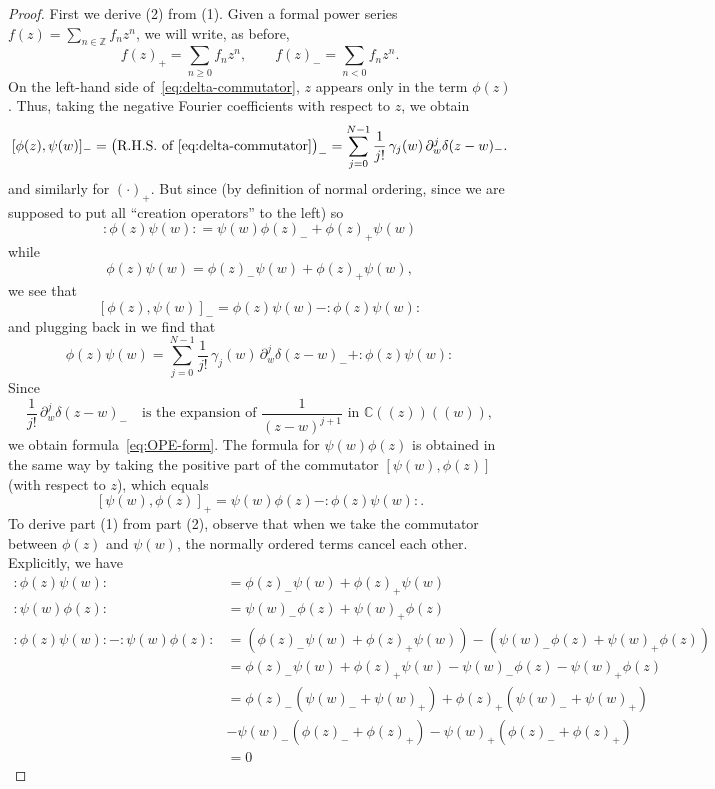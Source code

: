 \documentclass[12pt]{article}
\begin{document}
\begin{proof}
    First we derive (2) from (1).
    Given a formal power series $f(z)=\sum_{n\in\mathbb{Z}} f_n z^n$,
    we will write, as before,
    \[
        f(z)_+ = \sum_{n\ge 0} f_n z^n,
        \qquad
        f(z)_- = \sum_{n<0} f_n z^n.
    \]
    On the left-hand side of~\eqref{eq:delta-commutator},
    $z$ appears only in the term $\phi(z)$.
    Thus, taking the negative Fourier coefficients with respect to $z$, we obtain
    \[
        [\phi(z),\psi(w)]_- =
        \big(\text{R.H.S. of~\eqref{eq:delta-commutator}}\big)_- = \sum_{j=0}^{N-1} \frac{1}{j!}\,\gamma_j(w)\,
        \partial_w^j \delta(z-w)_-.
    \]
    and similarly for $(\cdot)_+$.
    But since (by definition of normal ordering, since we are supposed to put all “creation operators” to the left) so
    \[
        :\phi(z)\psi(w):
        = \psi(w)\phi(z)_- + \phi(z)_+\psi(w)
    \]
    while
    \[
        \phi(z)\psi(w) = \phi(z)_-\psi(w) + \phi(z)_+\psi(w),
    \]
    we see that
    \[
        [\phi(z),\psi(w)]_{-} =
        \phi(z)\psi(w) - :\phi(z)\psi(w):
    \]
    and plugging back in we find that
    \[
        \phi(z)\psi(w) = \sum_{j=0}^{N-1} \frac{1}{j!}\,\gamma_j(w)\,\partial_w^j \delta(z-w)_- + :\phi(z)\psi(w):
    \]
    Since
    \[
        \frac{1}{j!}\,\partial_w^j \delta(z-w)_-
        \quad \text{is the expansion of }
        \frac{1}{(z-w)^{j+1}}
        \text{ in } \mathbb{C}((z))((w)),
    \]
    we obtain formula~\eqref{eq:OPE-form}.
    The formula for $\psi(w)\phi(z)$ is obtained in the same way
    by taking the positive part of the commutator $[\psi(w),\phi(z)]$
    (with respect to $z$), which equals
    \[
        [\psi(w),\phi(z)]_+ = \psi(w)\phi(z) - :\phi(z)\psi(w):.
    \]
    To derive part (1) from part (2), observe that when we take the commutator
    between $\phi(z)$ and $\psi(w)$, the normally ordered terms cancel each other. Explicitly, we have
    \begin{align*}
        :\phi(z)\psi(w):
                                            & = \phi(z)_- \psi(w) + \phi(z)_+ \psi(w)                                             \\
        :\psi(w)\phi(z):
                                            & = \psi(w)_- \phi(z) + \psi(w)_+ \phi(z)                                             \\
        :\phi(z)\psi(w): - :\psi(w)\phi(z): & = (\phi(z)_- \psi(w) + \phi(z)_+ \psi(w)) - (\psi(w)_- \phi(z) + \psi(w)_+ \phi(z)) \\
                                            & = \phi(z)_- \psi(w) + \phi(z)_+ \psi(w) - \psi(w)_- \phi(z) - \psi(w)_+ \phi(z)     \\
                                            & = \phi(z)_- (\psi(w)_- + \psi(w)_+) + \phi(z)_+ (\psi(w)_- + \psi(w)_+)             \\
                                            & - \psi(w)_- (\phi(z)_- + \phi(z)_+) - \psi(w)_+ (\phi(z)_- + \phi(z)_+)             \\
                                            & = 0
    \end{align*}


\end{proof}
\end{document}
